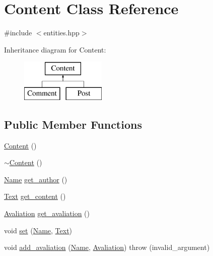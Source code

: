 \hypertarget{class_content}{}\section{Content Class Reference}
\label{class_content}


{\ttfamily \#include $<$entities.\+hpp$>$}

Inheritance diagram for Content\+:\begin{figure}[H]
\begin{center}
\leavevmode
\includegraphics[height=2.000000cm]{class_content}
\end{center}
\end{figure}
\subsection*{Public Member Functions}
\begin{DoxyCompactItemize}
\item 
\hyperlink{class_content_af14b7b5ebc756686ecde73dc09b57c56}{Content} ()
\item 
\hyperlink{class_content_aa28dc7ed5866fb0c22dc13c2a1fdb495}{$\sim$\+Content} ()
\item 
\hyperlink{class_name}{Name} \hyperlink{class_content_a422f6d0fa9bbc258b4f2d2c32e825f73}{get\+\_\+author} ()
\item 
\hyperlink{class_text}{Text} \hyperlink{class_content_a855ce935e96e9c811ef84e0b20c38a59}{get\+\_\+content} ()
\item 
\hyperlink{class_avaliation}{Avaliation} \hyperlink{class_content_a82ec2dba39b5d5ac82ba3081e3a71548}{get\+\_\+avaliation} ()
\item 
void \hyperlink{class_content_a97a7150f5500238ca0de6f73073d8e71}{set} (\hyperlink{class_name}{Name}, \hyperlink{class_text}{Text})
\item 
void \hyperlink{class_content_a8dfaac49e63b4142dd68b30564838adf}{add\+\_\+avaliation} (\hyperlink{class_name}{Name}, \hyperlink{class_avaliation}{Avaliation})  throw (invalid\+\_\+argument)
\end{DoxyCompactItemize}
